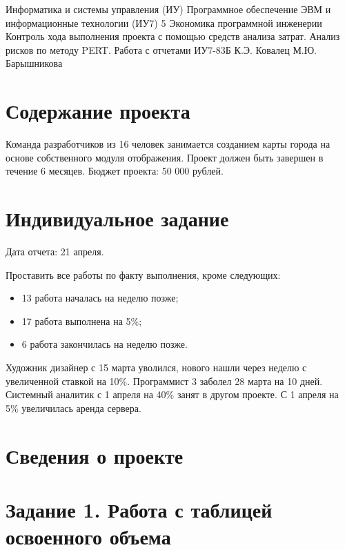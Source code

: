 \documentclass{bmstu}
\begin{document}
\makereporttitle
{Информатика и системы управления (ИУ)}
{Программное обеспечение ЭВМ и информационные технологии (ИУ7)}
{5}
{Экономика программной инженерии}
{Контроль хода выполнения проекта с помощью средств анализа
затрат. Анализ рисков по методу PERT. Работа с отчетами}
{}
{ИУ7-83Б}
{К.Э. Ковалец}
{М.Ю. Барышникова}


\setcounter{page}{2}

\section*{Содержание проекта}

Команда разработчиков из 16 человек занимается созданием карты города на основе собственного модуля отображения. Проект должен быть завершен в течение 6 месяцев. Бюджет проекта: 50 000 рублей.

\section*{Индивидуальное задание}

Дата отчета: 21 апреля.

Проставить все работы по факту выполнения, кроме следующих:

\begin{itemize}
    \item 13 работа началась на неделю позже;
    \item 17 работа выполнена на 5\%;
    \item 6 работа закончилась на неделю позже.
\end{itemize}

Художник дизайнер с 15 марта уволился, нового нашли через неделю с увеличенной ставкой на 10\%.
Программист 3 заболел 28 марта на 10 дней.
Системный аналитик с 1 апреля на 40\% занят в другом проекте.
С 1 апреля на 5\% увеличилась аренда сервера.

\section*{Сведения о проекте}


\clearpage



\section*{Задание 1. Работа с таблицей освоенного объема}
\end{document}
